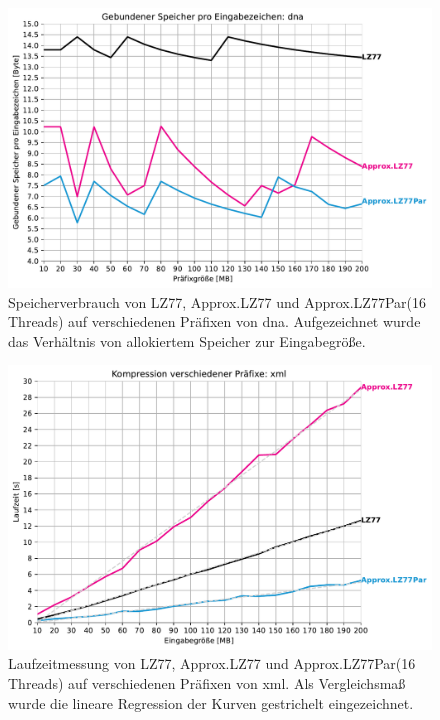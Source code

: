 \begin{figure}[H]
    \centering
    \caption{Speicherverbrauch von LZ77, Approx.LZ77 und Approx.LZ77Par(16 Threads) auf verschiedenen Präfixen von dna. Aufgezeichnet wurde das Verhältnis
    von allokiertem Speicher zur Eingabegröße.}
    \includegraphics[scale=0.65]{Images/progressive_mem_dna.pdf}
\end{figure}

\begin{figure}[H]
    \centering
    \caption{Laufzeitmessung von LZ77, Approx.LZ77 und Approx.LZ77Par(16 Threads) auf verschiedenen Präfixen von xml. Als Vergleichsmaß wurde 
    die lineare Regression der Kurven gestrichelt eingezeichnet.}
    \includegraphics[scale=0.68]{Images/progressive_xml.pdf}
\end{figure}

